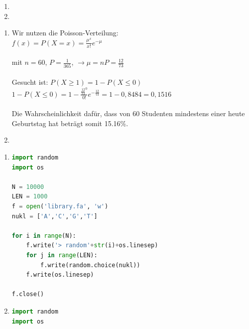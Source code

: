 \documentclass{homework}
\date{Montag, dem 26. November 2012}
\author{Stefan Meißner (4279113) und Niels Hoppe (4356370)}
\begin{document}
\maketitle
\begin{enumerate} 

\begin{enumerate}
\item

\item 
\end{enumerate}

\begin{enumerate}
\item
Wir nutzen die Poisson-Verteilung: \\
$f(x) = P(X=x) = \frac{\mu^x}{x!} e^{-\mu}$ \\ \\
mit $n = 60$, $P = \frac{1}{365}$, $\rightarrow \mu = nP = \frac{12}{73}$\\ \\
Gesucht ist: $P(X \geq 1) = 1 - P(X \leq 0)$ \\
$1-P(X \leq 0) = 1 - \frac{\frac{12}{73}^0}{0!} e^{-\frac{12}{73}} = 1 - 0,8484 = 0,1516$\\ \\
Die Wahrscheinlichkeit dafür, dass von 60 Studenten mindestens einer heute Geburtstag hat beträgt somit 15.16\%.
\item
\end{enumerate}


\begin{enumerate}
\item

\begin{lstlisting}[language=python]
import random
import os

N = 10000
LEN = 1000
f = open('library.fa', 'w')
nukl = ['A','C','G','T']

for i in range(N):
    f.write('> random'+str(i)+os.linesep)
    for j in range(LEN):
        f.write(random.choice(nukl))
    f.write(os.linesep)

f.close()
\end{lstlisting}

\item

\begin{lstlisting}[language=python]
import random
import os


\end{lstlisting}
\end{enumerate}
\end{enumerate}
\end{document}
